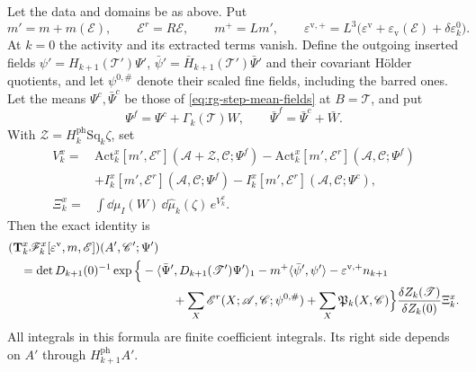 \begin{proposition}\label{prop:rg-step-density-identity}
Let the data and domains be as above. Put
\[
 m'=m+m(\mathscr E),\qquad \mathscr E^r=R\mathscr E,\qquad
 m^+=Lm',\qquad
 \varepsilon^{\mathrm v,+}
       =L^3\big(\varepsilon^{\mathrm v}
              +\varepsilon_{\mathrm v}(\mathscr E)+\delta\varepsilon_k^0\big).
\]
At $k=0$ the activity and its extracted terms vanish.
Define the outgoing inserted fields
$\psi'=H_{k+1}(\mathscr T')\Psi'$,
$\bar\psi'=\bar H_{k+1}(\mathscr T')\bar\Psi'$ and
their covariant H\"older quotients, and let
$\psi^{0,\#}$ denote their scaled fine fields,
including the barred ones.
Let the means $\Psi^c,\bar\Psi^c$ be those of
\eqref{eq:rg-step-mean-fields} at $B=\mathscr T$,
and put
\[
 \Psi^f=\Psi^c+\Gamma_k(\mathscr T)W,\qquad
 \bar\Psi^f=\bar\Psi^c+\bar W.
\]
With $\mathscr Z=H_k^{\mathrm{ph}}\mathrm{Sq}_k\zeta$,
set
\begin{equation}\label{eq:rg-step-fluctuation-exponent}
 \begin{split}
 V_k^x={}&
       \mathrm{Act}_k^x[m',\mathscr E^r]
                    (\mathscr A+\mathscr Z,\mathscr C;\Psi^f)
       -\mathrm{Act}_k^x[m',\mathscr E^r]
                    (\mathscr A,\mathscr C;\Psi^f)\\
       &+I_k^x[m',\mathscr E^r](\mathscr A,\mathscr C;\Psi^f)
       -I_k^x[m',\mathscr E^r](\mathscr A,\mathscr C;\Psi^c),\\
 \Xi_k^x={}&\int\dd\mu_I(W)\,\dd\widehat\mu_k(\zeta)\,e^{V_k^x}.
 \end{split}
\end{equation}
Then the exact identity is
\begin{equation}\label{eq:rg-step-density-identity}
 \begin{split}
 &(\mathbf T_k^x\mathscr F_k^x
                [\varepsilon^{\mathrm v},m,\mathscr E])
                                      (A',\mathscr C';\Psi')\\
 &\quad=\det D_{k+1}(0)^{-1}
       \exp\Big\{-\langle\bar\Psi',D_{k+1}(\mathscr T')\Psi'\rangle_1
                  -m^+\langle\bar\psi',\psi'\rangle
                  -\varepsilon^{\mathrm v,+}n_{k+1}\\
 &\hspace{48mm}
          +\sum_X\mathscr E^r(X;\mathscr A,\mathscr C;\psi^{0,\#})
          +\sum_X\mathfrak P_k(X,\mathscr C)\Big\}
                     \frac{\delta Z_k(\mathscr T)}{\delta Z_k(0)}\Xi_k^x.
 \end{split}
\end{equation}
All integrals in this formula are finite coefficient
integrals. Its right side depends on $A'$ through
$H_{k+1}^{\mathrm{ph}}A'$.
\end{proposition}


